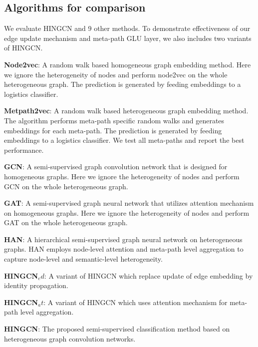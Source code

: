 \subsection{Algorithms for comparison}
\label{sec:algo-comp}
We evaluate HINGCN and 9 other methods. To demonstrate effectiveness of our edge update mechanism and meta-path GLU layer, we also includes two variants of HINGCN.

\noindent{\small$\bullet$}
\textbf{Node2vec\cite{GroverL16}}: A random walk based homogeneous graph embedding method. Here we ignore the heterogeneity of nodes and perform node2vec on the whole heterogeneous graph. The prediction is generated by feeding embeddings to a logistics classifier.

\noindent{\small$\bullet$}
\textbf{Metpath2vec\cite{DongCS17}}: A random walk based heterogeneous graph embedding method. The algorithm performs meta-path specific random walks and generates embeddings for each meta-path. The prediction is generated by feeding embeddings to a logistics classifier. We test all meta-paths and report the best performance.

\noindent{\small$\bullet$}
\textbf{GCN\cite{KipfW17}}: A semi-supervised graph convolution network that is designed for homogeneous graphs. Here we ignore the heterogeneity of nodes and perform GCN on the whole heterogeneous graph. 

\noindent{\small$\bullet$}
\textbf{GAT\cite{VelickovicCCRLB18}}: A semi-supervised graph neural network that utilizes attention mechanism on homogeneous graphs. Here we ignore the heterogeneity of nodes and perform GAT on the whole heterogeneous graph. 

\noindent{\small$\bullet$}
\textbf{HAN\cite{WangJSWYCY19}}:
A hierarchical semi-supervised graph neural network on heterogeneous graphs. HAN employs node-level attention and meta-path level aggregation to capture node-level and semantic-level heterogeneity.

\noindent{\small$\bullet$}
\textbf{HINGCN$_ed$}: 
A variant of HINGCN which replace update of edge embedding by identity propagation.

\noindent{\small$\bullet$}
\textbf{HINGCN$_at$}:
A variant of HINGCN which uses attention mechanism for meta-path level aggregation.

\noindent{\small$\bullet$}
\textbf{HINGCN}:
The proposed semi-supervised classification method based on heterogeneous graph convolution networks.


